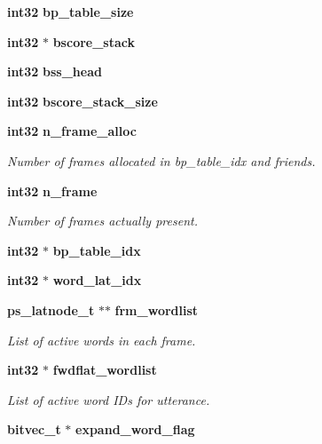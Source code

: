 \begin{DoxyCompactItemize}
\item 
{\bf int32} {\bfseries bp\-\_\-table\-\_\-size}\label{structngram__search__s_ae288500a2a3db50d4454546d66c826da}

\item 
{\bf int32} $\ast$ {\bfseries bscore\-\_\-stack}\label{structngram__search__s_adbbac268728dae5771cb4400649b62e2}

\item 
{\bf int32} {\bfseries bss\-\_\-head}\label{structngram__search__s_aed45eb7f0ed7bbf266a7eb8e4acd22fa}

\item 
{\bf int32} {\bfseries bscore\-\_\-stack\-\_\-size}\label{structngram__search__s_a041e34cc7c9dab32d05b00eeb5d6d622}

\item 
{\bf int32} {\bf n\-\_\-frame\-\_\-alloc}
\begin{DoxyCompactList}\small\item\em \-Number of frames allocated in bp\-\_\-table\-\_\-idx and friends. \end{DoxyCompactList}\item 
{\bf int32} {\bf n\-\_\-frame}
\begin{DoxyCompactList}\small\item\em \-Number of frames actually present. \end{DoxyCompactList}\item 
{\bf int32} $\ast$ {\bfseries bp\-\_\-table\-\_\-idx}\label{structngram__search__s_ad6c1eda51d21c066ead7d68541546485}

\item 
{\bf int32} $\ast$ {\bfseries word\-\_\-lat\-\_\-idx}\label{structngram__search__s_a175cf4fa7cffa91b1966343f5a6f6eaf}

\item 
{\bf ps\-\_\-latnode\-\_\-t} $\ast$$\ast$ {\bf frm\-\_\-wordlist}
\begin{DoxyCompactList}\small\item\em \-List of active words in each frame. \end{DoxyCompactList}\item 
{\bf int32} $\ast$ {\bf fwdflat\-\_\-wordlist}
\begin{DoxyCompactList}\small\item\em \-List of active word \-I\-Ds for utterance. \end{DoxyCompactList}\item 
{\bf bitvec\-\_\-t} $\ast$ {\bfseries expand\-\_\-word\-\_\-flag}\label{structngram__search__s_a1daa869d11179c53eb745da36a654fb3}


\end{DoxyCompactItemize}
